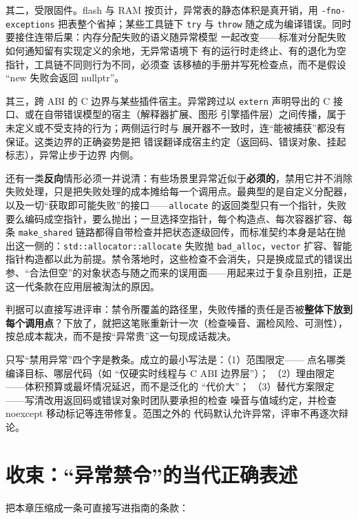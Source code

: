 \documentclass[12pt,a4paper,fontset=fandol]{ctexbook}
\newcommand{\Tp}[1]{\texttt{#1}}
\newcommand{\Bk}{\discretionary{}{}{}}
\begin{document}
其二，受限固件。flash 与 RAM 按页计，异常表的静态体积是真开销，用 \Tp{-fno-{\Bk}exceptions} 把表整个省掉；某些工具链下 \Tp{try} 与
\Tp{throw} 随之成为编译错误。同时要接住连带后果：内存分配失败的语义随异常模型
一起改变——标准对分配失败如何通知留有实现定义的余地，无异常语境下
有的运行时走终止、有的退化为空指针，工具链不同则行为不同，必须查
该移植的手册并写死检查点，而不是假设 ``new 失败会返回 nullptr''。

其三，跨 ABI 的 C 边界与某些插件宿主。异常跨过以 \Tp{extern}
声明导出的 C 接口、或在自带错误模型的宿主（解释器扩展、图形
引擎插件层）之间传播，属于未定义或不受支持的行为；两侧运行时与
展开器不一致时，连``能被捕获''都没有保证。这类边界的正确姿势是把
错误翻译成宿主约定（返回码、错误对象、挂起标志），异常止步于边界
内侧。

还有一类\textbf{反向}情形必须一并说清：有些场景里异常近似于\textbf{必须的}，禁用它并不消除失败处理，只是把失败处理的成本摊给每一个调用点。最典型的是自定义分配器，以及一切``获取即可能失败''的接口——\Tp{allocate} 的返回类型只有一个指针，失败要么编码成空指针，要么抛出；一旦选择空指针，每个构造点、每次容器扩容、每条 \Tp{make{\Bk}\_shared} 链路都得自带检查并把状态逐级回传，而标准契约本身是站在抛出这一侧的：\Tp{std::allocator::allocate} 失败抛 \Tp{bad{\Bk}\_alloc}，\Tp{vector} 扩容、智能指针构造都以此为前提。禁令落地时，这些检查不会消失，只是换成显式的错误出参、``合法但空''的对象状态与随之而来的误用面——用起来过于复杂且别扭，正是这一代条款在应用层被淘汰的原因。

判据可以直接写进评审：禁令所覆盖的路径里，失败传播的责任是否被\textbf{整体下放到每个调用点}？下放了，就把这笔账重新计一次（检查噪音、漏检风险、可测性），按总成本裁决，而不是按``异常贵''这一句现成话裁决。

\begin{bestpractice}[title={写异常禁令时，把三个限定语一起写进条款}]
只写``禁用异常''四个字是教条。成立的最小写法是：（1）范围限定——
点名哪类编译目标、哪层代码（如 ``仅硬实时线程与 C ABI 边界层''）；
（2）理由限定——体积预算或最坏情况延迟，而不是泛化的 ``代价大''；
（3）替代方案限定——写清改用返回码或错误对象时团队要承担的检查
噪音与值域约定，并检查 noexcept 移动标记等连带修复。范围之外的
代码默认允许异常，评审不再逐次辩论。
\end{bestpractice}

\section{收束：``异常禁令''的当代正确表述}
\label{sec:ch10-close}

把本章压缩成一条可直接写进指南的条款：
\end{document}
